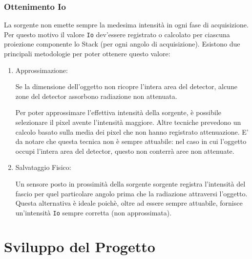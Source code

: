\documentclass[a4paper,12pt, doubleside]{report}
\begin{document}
            \subsection{Ottenimento Io}
                \label{sub:io}
                \par
                    La sorgente non emette sempre la medesima intensità in ogni fase di acquisizione. Per questo motivo il valore \texttt{Io} dev'essere registrato o calcolato per ciascuna proiezione componente lo Stack (per ogni angolo di acquisizione).
                    Esistono due principali metodologie per poter ottenere questo valore:
               
                    \begin{enumerate}
                        \item Approssimazione:
                            \par
                                Se la dimensione dell'oggetto non ricopre l'intera area del detector, alcune zone del detector assorbono radiazione non attenuata.
                                
                                Per poter approssimare l'effettiva intensità della sorgente, è possibile selezionare il pixel avente l'intensità maggiore. Altre tecniche prevedono un calcolo basato sulla media dei pixel che non hanno registrato attenuazione.
                                E' da notare che questa tecnica non è sempre attuabile: nel caso in cui l'oggetto occupi l'intera area del detector, questo non conterrà aree non attenuate.
                        
                        \item Salvataggio Fisico:
                            \par
                                Un sensore posto in prossimità della sorgente sorgente registra l'intensità del fascio per quel particolare angolo prima che la radiazione attraversi l'oggetto. Questa alternativa è ideale poichè, oltre ad essere sempre attuabile, fornisce un'intensità \texttt{Io} sempre corretta (non approssimata).
                    \end{enumerate}                
                
                   
                    
                    
                                  
    \chapter{Sviluppo del Progetto}
\end{document}
